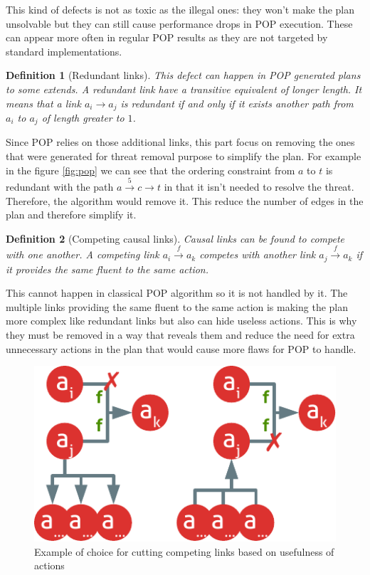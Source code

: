 \documentclass[]{article}
\newtheorem{definition}{Definition}
\begin{document}
This kind of defects is not as toxic as the illegal ones: they won't
make the plan unsolvable but they can still cause performance drops in
POP execution. These can appear more often in regular POP results as
they are not targeted by standard implementations.

\begin{definition}[Redundant links]

This defect can happen in POP generated plans to some extends. A
redundant link have a transitive equivalent of longer length. It means
that a link \(a_i \to a_j\) is redundant if and only if it exists
another path from \(a_i\) to \(a_j\) of length greater to \(1\).

\end{definition}

Since POP relies on those additional links, this part focus on removing
the ones that were generated for threat removal purpose to simplify the
plan. For example in the figure \ref{fig:pop} we can see that the
ordering constraint from \(a\) to \(t\) is redundant with the path
\(a \xrightarrow{5} c \to t\) in that it isn't needed to resolve the
threat. Therefore, the algorithm would remove it. This reduce the number
of edges in the plan and therefore simplify it.

\begin{definition}[Competing causal links]

Causal links can be found to compete with one another. A competing link
\(a_i \xrightarrow{f} a_k\) competes with another link
\(a_j \xrightarrow{f} a_k\) if it provides the same fluent to the same
action.

\end{definition}

This cannot happen in classical POP algorithm so it is not handled by
it. The multiple links providing the same fluent to the same action is
making the plan more complex like redundant links but also can hide
useless actions. This is why they must be removed in a way that reveals
them and reduce the need for extra unnecessary actions in the plan that
would cause more flaws for POP to handle.

\begin{figure}[htbp]
\centering
\includegraphics{graphics/competing.pdf}
\caption{Example of choice for cutting competing links based on
usefulness of actions\label{fig:competing}}
\end{figure}
\end{document}

